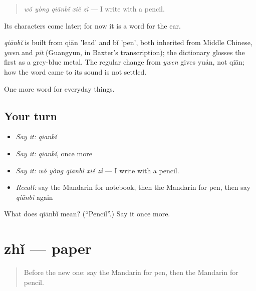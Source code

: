 \begin{quote}
\emph{wǒ yòng qiānbǐ xiě zì} — I write with a pencil.
\end{quote}

Its characters come later; for now it is a word for the ear.

\begin{cousinweb}
\emph{qiānbǐ} is built from qiān 'lead' and bǐ 'pen', both inherited from Middle Chinese, \emph{ywen} and \emph{pit} (Guangyun, in Baxter's transcription); the dictionary glosses the first as a grey-blue metal. The regular change from \emph{ywen} gives yuán, not qiān; how the word came to its sound is not settled.
\end{cousinweb}

\begin{grammarlens}[title={What you've built}]
One more word for everyday things.
\end{grammarlens}

\subsection*{Your turn}
\begin{itemize}
\raggedright
  \item \emph{Say it:} \emph{qiānbǐ}
  \item \emph{Say it:} \emph{qiānbǐ}, once more
  \item \emph{Say it:} \emph{wǒ yòng qiānbǐ xiě zì} — I write with a pencil.
  \item \emph{Recall:} say the Mandarin for notebook, then the Mandarin for pen, then say \emph{qiānbǐ} again
\end{itemize}

\begin{tcolorbox}[breakable,colback=teal!4,colframe=teal!35!black,title={Before you move on}]
What does qiānbǐ mean? (\textquotedblleft{}Pencil\textquotedblright{}.) Say it once more.
\end{tcolorbox}
\section[zhǐ]{zhǐ — paper}

\label{lesson:ZH-C104-zhi}



\begin{quote}
Before the new one: say the Mandarin for pen, then the Mandarin for pencil.
\end{quote}


